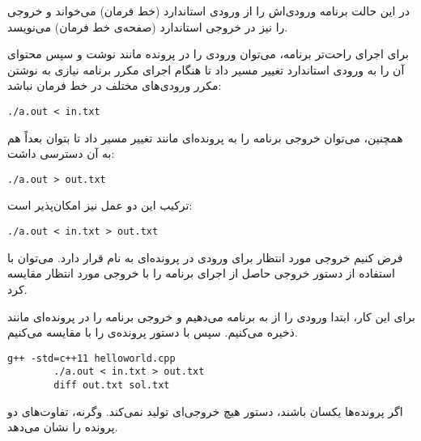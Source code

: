 \documentclass{utap}
\begin{document}
	در این حالت برنامه ورودی‌اش را از ورودی استاندارد  (خط فرمان) می‌خواند و خروجی را نیز در خروجی استاندارد  (صفحه‌ی خط فرمان) می‌نویسد.
	
	برای اجرای راحت‌تر برنامه، می‌توان ورودی را در پرونده مانند  نوشت و سپس محتوای آن را به ورودی استاندارد تغییر مسیر داد تا هنگام اجرای مکرر برنامه نیازی به نوشتن مکرر ورودی‌های مختلف در خط فرمان نباشد:
	\begin{latin}%
		\begin{Verbatim}[fontsize=\small]
		./a.out < in.txt
		\end{Verbatim}
	\end{latin}
	
	همچنین، می‌توان خروجی برنامه را به پرونده‌ای مانند  تغییر مسیر داد تا بتوان بعداً هم به آن دسترسی داشت:
	\begin{latin}%
		\begin{Verbatim}[fontsize=\small]
		./a.out > out.txt
		\end{Verbatim}
	\end{latin}
	
	ترکیب این دو عمل نیز امکان‌پذیر است:
	\begin{latin}%
		\begin{Verbatim}[fontsize=\small]
		./a.out < in.txt > out.txt
		\end{Verbatim}
	\end{latin}
	
	فرض کنیم خروجی مورد انتظار برای ورودی  در پرونده‌ای به نام  قرار دارد. می‌توان با استفاده از دستور  خروجی حاصل از اجرای برنامه را با خروجی مورد انتظار مقایسه کرد.
	
	برای این کار، ابتدا ورودی را از  به برنامه می‌دهیم و خروجی برنامه را در پرونده‌ای مانند  ذخیره می‌کنیم. سپس با دستور  پرونده‌ی  را با  مقایسه می‌کنیم.
	\begin{latin}%
		\begin{Verbatim}[fontsize=\small]
		g++ -std=c++11 helloworld.cpp
		./a.out < in.txt > out.txt
		diff out.txt sol.txt
		\end{Verbatim}
	\end{latin}
	
	اگر پرونده‌ها یکسان باشند، دستور  هیچ خروجی‌ای تولید نمی‌کند. وگرنه، تفاوت‌های دو پرونده را نشان می‌دهد.
	
\end{document}
